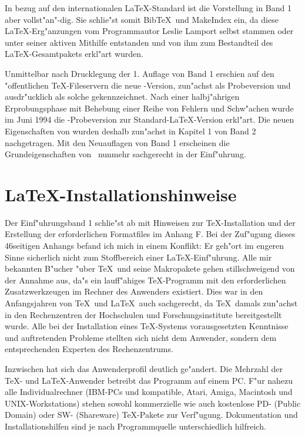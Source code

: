 \documentclass[twoside]{report}
\begin{document}
In bezug auf den internationalen \LaTeX-Standard ist die Vorstellung
in Band 1 aber vollst"an"-dig. Sie schlie"st somit Bib\TeX\
und MakeIndex ein, da diese \LaTeX-Erg"anzungen
vom Programmautor Leslie Lamport selbst stammen oder unter seiner
aktiven Mithilfe entstanden und von ihm zum Bestandteil des \LaTeX-Gesamtpakets 
erkl"art wurden.

Unmittelbar nach Drucklegung der 1. Auflage von Band 1 erschien auf den
"offentlichen \TeX-Fileservern die neue \LaTeXe-Version, zun"achst als
Probeversion und ausdr"ucklich als solche gekennzeichnet. Nach einer
halbj"ahrigen Erprobungsphase mit Behebung einer Reihe von Fehlern und
Schw"achen wurde im Juni 1994 die \LaTeXe-Probeversion zur
Standard-\LaTeX-Version erkl"art. Die neuen Eigenschaften von \LaTeXe wurden
deshalb zun"achst in Kapitel 1 von Band 2 nachgetragen. Mit den Neuauflagen
von Band 1 erscheinen die Grundeigenschaften
von \LaTeXe\ nunmehr sachgerecht in der Einf"uhrung. 

\section{\LaTeX-Installationshinweise}
Der Einf"uhrungsband 1 schlie"st ab mit Hinweisen zur \TeX-Installation und der
Erstellung der erforderlichen Formatfiles im Anhang F. 
Bei der Zuf"ugung dieses 46seitigen Anhangs befand ich mich in einem Konflikt:
Er geh"ort im engeren Sinne sicherlich nicht zum Stoffbereich einer 
\LaTeX-Einf"uhrung.
Alle mir bekannten B"ucher "uber \TeX\ und seine Makropakete gehen
stillschweigend von der Annahme aus, da"s ein lauff"ahiges \TeX-Programm
mit den erforderlichen Zusatzwerkzeugen im Rechner des Anwenders existiert.
Dies war in den Anfangsjahren von \TeX\ und \LaTeX\ auch sachgerecht, da
\TeX\ damals zun"achst in den Rechenzentren der Hochschulen und 
Forschungsinstitute bereitgestellt wurde. Alle bei der Installation eines
\TeX-Systems vorausgesetzten Kenntnisse und auftretenden Probleme stellten
sich nicht dem Anwender, sondern dem entsprechenden Experten des
Rechenzentrums.

Inzwischen hat sich das Anwenderprofil deutlich ge"andert. Die Mehrzahl
der \TeX- und \LaTeX-Anwender betreibt das Programm auf einem PC. 
F"ur nahezu alle Individualrechner (IBM-PCs und kompatible, Atari, Amiga,
Macintosh und UNIX-Workstations) stehen sowohl kommerzielle wie auch
kostenlose PD- (Public Domain) oder SW- (Shareware) \TeX-Pakete zur 
Verf"ugung. Dokumentation und Installationshilfen sind je nach Programmquelle
unterschiedlich hilfreich. 
\end{document}
